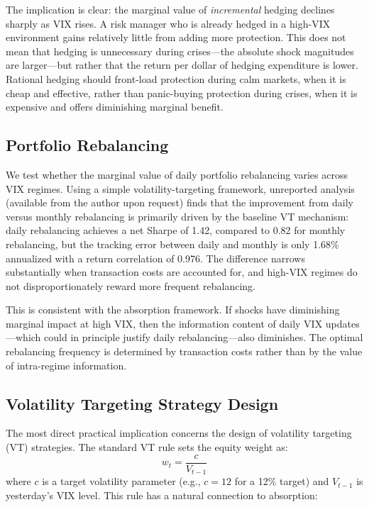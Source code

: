 \documentclass[12pt,a4paper]{article}
\begin{document}
The implication is clear: the marginal value of \textit{incremental} hedging declines sharply as VIX rises. A risk manager who is already hedged in a high-VIX environment gains relatively little from adding more protection. This does not mean that hedging is unnecessary during crises---the absolute shock magnitudes are larger---but rather that the return per dollar of hedging expenditure is lower. Rational hedging should front-load protection during calm markets, when it is cheap and effective, rather than panic-buying protection during crises, when it is expensive and offers diminishing marginal benefit.

\subsection{Portfolio Rebalancing}

We test whether the marginal value of daily portfolio rebalancing varies across VIX regimes. Using a simple volatility-targeting framework, unreported analysis (available from the author upon request) finds that the improvement from daily versus monthly rebalancing is primarily driven by the baseline VT mechanism: daily rebalancing achieves a net Sharpe of 1.42, compared to 0.82 for monthly rebalancing, but the tracking error between daily and monthly is only 1.68\% annualized with a return correlation of 0.976. The difference narrows substantially when transaction costs are accounted for, and high-VIX regimes do not disproportionately reward more frequent rebalancing.

This is consistent with the absorption framework. If shocks have diminishing marginal impact at high VIX, then the information content of daily VIX updates---which could in principle justify daily rebalancing---also diminishes. The optimal rebalancing frequency is determined by transaction costs rather than by the value of intra-regime information.

\subsection{Volatility Targeting Strategy Design}

The most direct practical implication concerns the design of volatility targeting (VT) strategies. The standard VT rule sets the equity weight as:
\begin{equation}
w_t = \frac{c}{V_{t-1}}
\label{eq:vt_weight}
\end{equation}
where $c$ is a target volatility parameter (e.g., $c = 12$ for a 12\% target) and $V_{t-1}$ is yesterday's VIX level. This rule has a natural connection to absorption:
\end{document}

